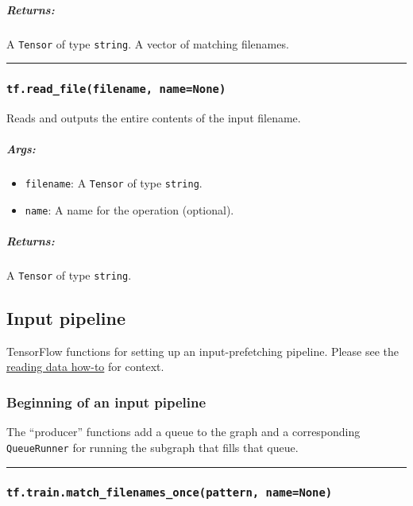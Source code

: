 \subparagraph{Returns: }\label{returns-47}

A \texttt{Tensor} of type \texttt{string}. A vector of matching
filenames.

\begin{center}\rule{0.5\linewidth}{\linethickness}\end{center}

\subsubsection{\texorpdfstring{\texttt{tf.read\_file(filename,\ name=None)}
}{tf.read\_file(filename, name=None) }}\label{tf.readux5ffilefilename-namenone}

Reads and outputs the entire contents of the input filename.

\subparagraph{Args: }\label{args-57}

\begin{itemize}
\tightlist
\item
  \texttt{filename}: A \texttt{Tensor} of type \texttt{string}.
\item
  \texttt{name}: A name for the operation (optional).
\end{itemize}

\subparagraph{Returns: }\label{returns-48}

A \texttt{Tensor} of type \texttt{string}.

\subsection{Input pipeline }\label{input-pipeline}

TensorFlow functions for setting up an input-prefetching pipeline.
Please see the \href{../../how_tos/reading_data/index.md}{reading data
how-to} for context.

\subsubsection{Beginning of an input pipeline
}\label{beginning-of-an-input-pipeline}

The ``producer'' functions add a queue to the graph and a corresponding
\texttt{QueueRunner} for running the subgraph that fills that queue.

\begin{center}\rule{0.5\linewidth}{\linethickness}\end{center}

\subsubsection{\texorpdfstring{\texttt{tf.train.match\_filenames\_once(pattern,\ name=None)}
}{tf.train.match\_filenames\_once(pattern, name=None) }}\label{tf.train.matchux5ffilenamesux5foncepattern-namenone}

